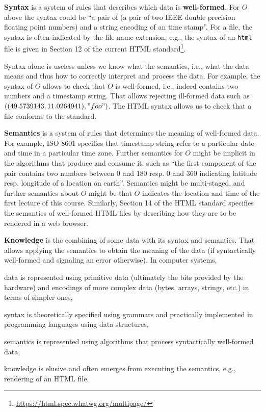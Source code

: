 \textbf{Syntax} is a system of rules that describes which data is \textbf{well-formed}.
For $O$ above the syntax could be ``a pair of (a pair of two IEEE double precision floating point numbers) and a string encoding of an time stamp''. 
For a file, the syntax is often indicated by the file name extension, e.g., the syntax of an \texttt{html} file is given in Section 12 of the current HTML standard\footnote{\url{https://html.spec.whatwg.org/multipage/}}.

Syntax alone is useless unless we know what the semantics, i.e., what the data means and thus how to correctly interpret and process the data.
For example, the syntax of $O$ allows to check that $O$ is well-formed, i.e., indeed contains two numbers and a timestamp string.
That allows rejecting ill-formed data such as $((49.5739143, 11.0264941), "foo")$.
The HTML syntax allows us to check that a file conforms to the standard.

\textbf{Semantics} is a system of rules that determines the meaning of well-formed data.
For example, ISO 8601 specifies that timestamp string refer to a particular date and time in a particular time zone.
Further semantics for $O$ might be implicit in the algorithms that produce and consume it: such as ``the first component of the pair contains two numbers between $0$ and $180$ resp. $0$ and $360$ indicating latitude resp. longitude of a location on earth''.
Semantics might be multi-staged, and further semantics about $O$ might be that $O$ indicates the location and time of the first lecture of this course.
Similarly, Section 14 of the HTML standard specifies the semantics of well-formed HTML files by describing how they are to be rendered in a web browser.

\textbf{Knowledge} is the combining of some data with its syntax and semantics.
That allows applying the semantics to obtain the meaning of the data (if syntactically well-formed and signaling an error otherwise).
In computer systems,
\begin{compactitem}
 \item data is represented using primitive data (ultimately the bits provided by the hardware) and encodings of more complex data (bytes, arrays, strings, etc.) in terms of simpler ones,
 \item syntax is theoretically specified using grammars and practically implemented in programming languages using data structures,
 \item semantics is represented using algorithms that process syntactically well-formed data,
 \item knowledge is elusive and often emerges from executing the semantics, e.g., rendering of an HTML file.
\end{compactitem}

